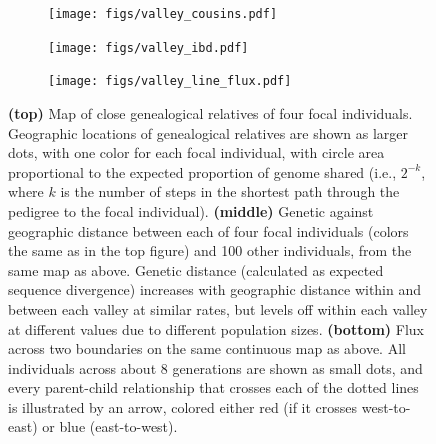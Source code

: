 \documentclass{ar-1col}
\begin{document}
\begin{figure}	%
    \centering
    \begin{subfigure}{0.85\textwidth}
        \centering
        \texttt{[image: figs/valley\_cousins.pdf]}
        \label{cousin_map}
    \end{subfigure}
    \begin{subfigure}{0.75\textwidth}
        \centering
        \texttt{[image: figs/valley\_ibd.pdf]}
        \label{ibd}
    \end{subfigure}
    \begin{subfigure}{0.85\textwidth}
        \centering
        \texttt{[image: figs/valley\_line\_flux.pdf]}
        \label{valleyflux}
    \end{subfigure}
        \caption{
            \textbf{(top)} Map of close genealogical relatives of four focal individuals.
            Geographic locations of 
            genealogical relatives are shown as larger dots, with one color for each focal individual,
            with circle area proportional to the expected proportion of genome shared
            (i.e., $2^{-k}$, where $k$ is the number of steps in the shortest path through the pedigree to the focal individual).
            \textbf{(middle)}
            Genetic against geographic distance between each of four focal individuals
            (colors the same as in the top figure)
            and 100 other individuals, from the same map as above.
            Genetic distance (calculated as expected sequence divergence)
            increases with geographic distance within and between each valley at similar rates,
            but levels off within each valley at different values
            due to different population sizes.
            \textbf{(bottom)}
            Flux across two boundaries on the same continuous map as above.
            All individuals across about 8 generations are shown as small dots,
            and every parent-child relationship that crosses each of the dotted lines
            is illustrated by an arrow, colored either red (if it crosses west-to-east) or blue (east-to-west).
        }
        \label{fig:dispersal}
\end{figure}
\end{document}
